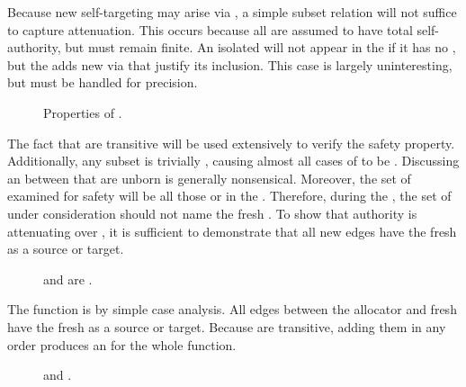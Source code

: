 Because new self-targeting \TMaccessEdges{} may arise via \TMallocation{}, a simple subset relation will not suffice to capture attenuation.
This occurs because all \TMobjs{} are assumed to have total self-authority, but \TMpotTransfer{} must remain finite.
An isolated \TMobj{} will not appear in the \TMdirAccAG{} if it has no \TMcaps{}, but the \TMcreate{} \TMop{} adds new \TMaccessEdges{} via \TMcaps{} that justify its inclusion.
This case is largely uninteresting, but must be handled for precision.

\begin{figure}
  \COQDOCagReduceTransSubset{}
  \COQDOCagReduceTrans{}
  \COQDOCagReduceSubsetAG{}
  \caption{Properties of \COQagReduce{}.}
\end{figure}

The fact that \TMattenuations{} are transitive will be used extensively to verify the safety property.
Additionally, any subset is trivially \TMattenuating{}, causing almost all cases of \COQpotAccOp{} to be \TMattenuating{}.
Discussing an \TMattenuation{} between \TMobjs{} that are unborn is generally nonsensical.
Moreover, the set of \TMobjs{} examined for safety will be all those \TMalive{} or \TMdead{} in the \TMsystemState{}.
Therefore, during the \TMcreate{} \TMop{}, the set of \TMobjs{} under consideration should not name the fresh \TMobj{}.
To show that authority is attenuating over \COQendow{}, it is sufficient to demonstrate that all new edges have the fresh \TMobj{} as a source or target.

\begin{figure}
  \COQDOCagReduceInsert{}
  \COQDOCagReduceEndow{}
  \caption{\TMinsert{} and \TMendow{} are \TMattenuating{}. \label{fig:safety:attenuatingEndow}}
\end{figure}

The \COQinsert{} function is \TMattenuating{} by simple case analysis.
All edges between the allocator and fresh \TMobj{} have the fresh \TMobj{} as a source or target.
Because \TMattenuations{} are transitive, adding them in any order produces an \TMattenuation{} for the whole function.

\begin{figure}
  \COQDOCAGproject{}
  \COQDOCAGprojectEndow{}
  \caption{\COQAGproject{} and \COQendow{}. \label{fig:safety:AGproject}}
\end{figure}

